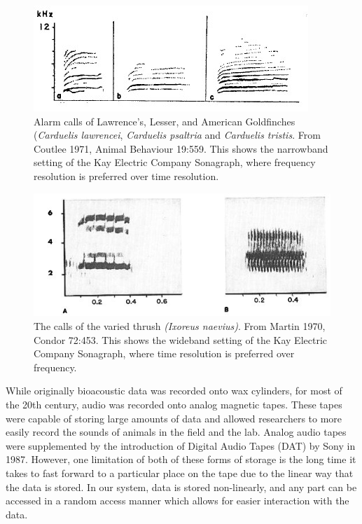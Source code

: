 \begin{figure}[t]
\centering
\includegraphics[width=\columnwidth]{figures/sonagraph1}
\caption{Alarm calls of Lawrence's, Lesser, and American Goldfinches
  (\textit{Carduelis lawrencei}, \textit{Carduelis psaltria} and
  \textit{Carduelis tristis}. From Coutlee 1971, Animal Behaviour
  19:559.  This shows the narrowband setting of the Kay Electric
  Company Sonagraph, where frequency resolution is preferred over time
  resolution.}
\label{fig:sonagraph1}
\end{figure}

\begin{figure}[t]
\centering
\includegraphics[width=\columnwidth]{figures/sonagraph2}
\caption{The calls of the varied thrush \textit{(Ixoreus
    naevius)}. From Martin 1970, Condor 72:453.  This shows the
  wideband setting of the Kay Electric Company Sonagraph, where time
  resolution is preferred over frequency.}
\label{fig:sonagraph2}
\end{figure}

While originally bioacoustic data was recorded onto wax cylinders, for
most of the 20th century, audio was recorded onto analog magnetic
tapes.  These tapes were capable of storing large amounts of data and
allowed researchers to more easily record the sounds of animals in the
field and the lab.  Analog audio tapes were supplemented by the
introduction of Digital Audio Tapes (DAT) by Sony in 1987.  However,
one limitation of both of these forms of storage is the long time it
takes to fast forward to a particular place on the tape due to the
linear way that the data is stored.  In our system, data is stored
non-linearly, and any part can be accessed in a random access manner
which allows for easier interaction with the data.

